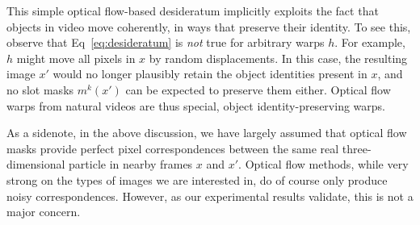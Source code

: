 \documentclass{article}
\newcommand{\jd}[1]{\textcolor{orange}{[DJ: #1]}}
\begin{document}
This simple optical flow-based desideratum implicitly exploits the fact that objects in video move coherently, in ways that preserve their identity. To see this, observe that Eq~\eqref{eq:desideratum} is \emph{not} true for arbitrary warps $h$. For example, $h$ might move all pixels in $x$ by random displacements. In this case, the resulting image $x'$ would no longer plausibly retain the object identities present in $x$, and no slot masks $m^k(x')$ can be expected to preserve them either. Optical flow warps from natural videos are thus special, object identity-preserving warps.

As a sidenote, in the above discussion, we have largely assumed that optical flow masks provide perfect pixel correspondences between the same real three-dimensional particle in nearby frames $x$ and $x'$. Optical flow methods, while very strong on the types of images we are interested in, do of course only produce noisy correspondences. However, as our experimental results validate, this is not a major concern.







\end{document}
